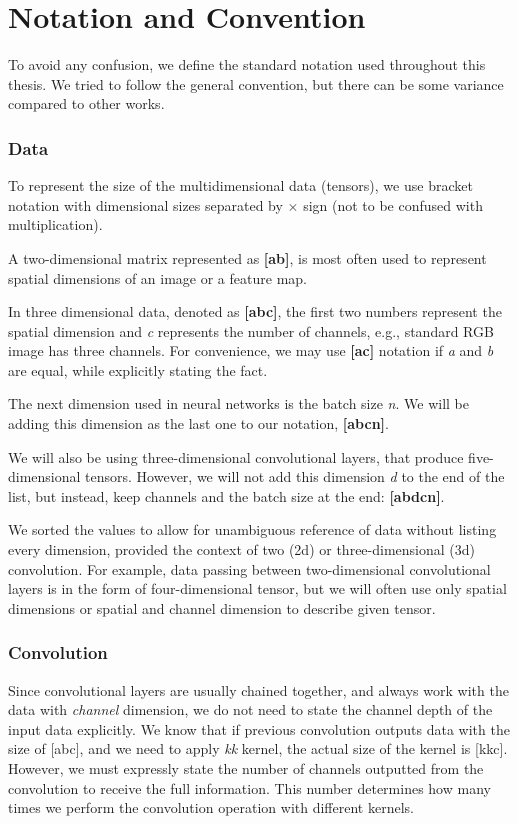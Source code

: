 \section{Notation and Convention}
\label{sec:notation}
To avoid any confusion, we define the standard notation used throughout this thesis. We tried to follow the general convention, but there can be some variance compared to other works.

\subsubsection*{Data}

To represent the size of the multidimensional data (tensors), we use bracket notation with dimensional sizes separated by $\times $ sign (not to be confused with multiplication).

A two-dimensional matrix represented as \textbf{[a\x b]}, is most often used to represent spatial dimensions of an image or a feature map. 

In three dimensional data, denoted as \textbf{[a\x b\x c]}, the first two numbers represent the spatial dimension and \textit{c} represents the number of channels, e.g., standard RGB image has three channels. For convenience, we may use \textbf{[a\x c]} notation if \textit{a} and \textit{b} are equal, while explicitly stating the fact.

The next dimension used in neural networks is the batch size \textit{n}. We will be adding this dimension as the last one to our notation, \textbf{[a\x b\x c\x n]}.

We will also be using three-dimensional convolutional layers, that produce five-dimensional tensors. However, we will not add this dimension \textit{d} to the end of the list, but instead, keep channels and the batch size at the end: \textbf{[a\x b\x d\x c\x n]}. 

We sorted the values to allow for unambiguous reference of data without listing every dimension, provided the context of two (2d) or three-dimensional (3d) convolution. For example, data passing between two-dimensional convolutional layers is in the form of four-dimensional tensor, but we will often use only spatial dimensions or spatial and channel dimension to describe given tensor.

\subsubsection*{Convolution}
Since convolutional layers are usually chained together, and always work with the data with \textit{channel} dimension, we do not need to state the channel depth of the input data explicitly. We know that if previous convolution outputs data with the size of [a\x b\x c], and we need to apply \textit{k\x k} kernel, the actual size of the kernel is [k\x k\x c]. However, we must expressly state the number of channels outputted from the convolution to receive the full information. This number determines how many times we perform the convolution operation with different kernels. 

